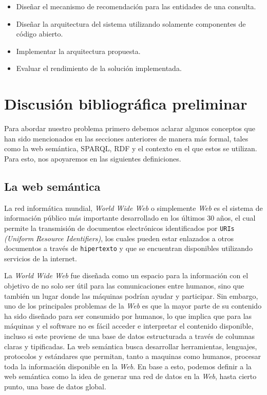 \documentclass[conference,compsoc]{IEEEtran}
\begin{document}
\begin{itemize}
    \item Diseñar el mecanismo de recomendación para las entidades de una consulta.
    \item Diseñar la arquitectura del sistema utilizando solamente componentes de código abierto.
    \item Implementar la arquitectura propuesta.
    \item Evaluar el rendimiento de la solución implementada.
\end{itemize}

\section{Discusión bibliográfica preliminar}

Para abordar nuestro problema primero debemos aclarar algunos conceptos que han sido
mencionados en las secciones anteriores de manera más formal, tales como la web semántica, SPARQL, RDF y el
contexto en el que estos se utilizan. Para esto, nos apoyaremos en las siguientes definiciones.

    \subsection{La web semántica}

La red informática mundial, \textit{World Wide Web} o simplemente \textit{Web} es el sistema de información público más importante
desarrollado en los últimos 30 años, el cual permite la transmisión de documentos electrónicos identificados
por \texttt{URIs} \textit{(Uniform Resource Identifiers)}, los cuales pueden estar enlazados a otros documentos
a través de \texttt{hipertexto} y que se encuentran disponibles utilizando servicios de la internet.

La \textit{World Wide Web} fue diseñada como un espacio para la información con el objetivo de no solo ser
útil para las comunicaciones entre humanos, sino que también un lugar donde las máquinas podrían ayudar y participar.
Sin embargo, uno de los principales problemas de la \textit{Web} es que la mayor parte de su contenido ha sido
diseñado para ser consumido por humanos, lo que implica que para las máquinas y el software no es fácil acceder 
e interpretar el contenido disponible, incluso si este proviene de una base de datos estructurada a través de
columnas claras y tipificadas. La web semántica busca desarrollar herramientas,
lenguajes, protocolos y estándares que permitan, tanto a maquinas como humanos, procesar toda la información disponible en la
\textit{Web}. En base a esto, podemos definir a la web semántica como la idea de generar
una red de datos en la \textit{Web}, hasta cierto punto, una base de datos global. \cite{berners1998semantic}
\end{document}
